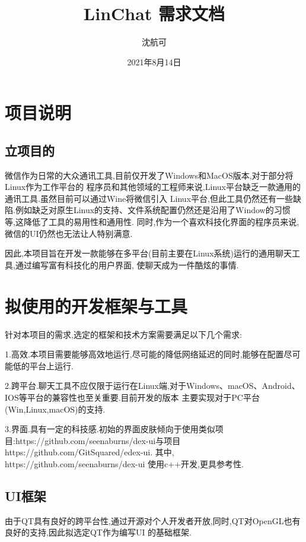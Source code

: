 \documentclass[UTF8]{ctexart}
\title{LinChat 需求文档}
\author{沈航可}
\date{2021年8月14日}
\begin{document}
\maketitle
\section{项目说明}
\subsection{立项目的}
微信作为日常的大众通讯工具,目前仅开发了Windows和MacOS版本,对于部分将Linux作为工作平台的
程序员和其他领域的工程师来说,Linux平台缺乏一款通用的通讯工具.虽然目前可以通过Wine将微信引入
Linux平台,但此工具仍然还有一些缺陷.例如缺乏对原生Linux的支持、文件系统配置仍然还是沿用了Window的习惯
等,这降低了工具的易用性和通用性.
同时,作为一个喜欢科技化界面的程序员来说,微信的UI仍然也无法让人特别满意.

因此,本项目旨在开发一款能够在多平台(目前主要在Linux系统)运行的通用聊天工具,通过编写富有科技化的用户界面,
使聊天成为一件酷炫的事情.

\section{拟使用的开发框架与工具}
针对本项目的需求,选定的框架和技术方案需要满足以下几个需求:

1.高效.本项目需要能够高效地运行,尽可能的降低网络延迟的同时,能够在配置尽可能低的平台上运行.

2.跨平台.聊天工具不应仅限于运行在Linux端,对于Windows、macOS、Android、IOS等平台的兼容性也至关重要.目前开发的版本
主要实现对于PC平台(Win,Linux,macOS)的支持.

3.界面.具有一定的科技感.初始的界面皮肤倾向于使用类似项目:https://github.com/seenaburns/dex-ui与项目https://github.com/GitSquared/edex-ui.
其中, https://github.com/seenaburns/dex-ui 使用c++开发,更具参考性.

\subsection{UI框架}
由于QT具有良好的跨平台性,通过开源对个人开发者开放,同时,QT对OpenGL也有良好的支持,因此拟选定QT作为编写UI
的基础框架.
\end{document}

